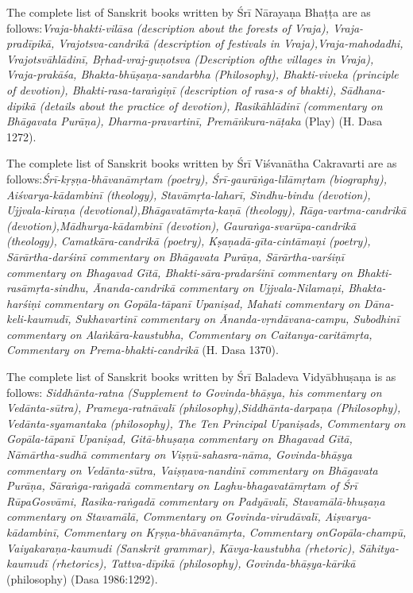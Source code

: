 The complete list of Sanskrit books written by Śrī Nārayaṇa Bhaṭṭa are as follows:{\sl  Vraja-bhakti-vilāsa {\rm (description about the forests of Vraja)}, Vraja-pradīpikā, Vrajotsva-candrikā {\rm (description of festivals in Vraja)},\break Vraja-mahodadhi, Vrajotsvāhlādinī, Bṛhad-vraj-guṇotsva {\rm (Description of\break the villages in Vraja)}, Vraja-prakāśa, Bhakta-bhūṣaṇa-sandarbha {\rm (Philosophy)}, Bhakti-viveka {\rm (principle of devotion)}, Bhakti-rasa-taraṅgiṇī {\rm (description of {\sl rasa}-s of {\sl bhakti})}, Sādhana-dipikā {\rm (details about the practice of devotion)}, Rasikāhlādinī {\rm (commentary on {\sl Bhāgavata Purāṇa})}, Dharma-pra\-vartinī, Premāṅkura-nāṭaka} {\rm (Play)} {\rm (H. Dasa 1272)}. 

{\rm The complete list of Sanskrit books written by Śrī Viśvanātha Cakra\-varti are as follows:}{\sl  Śrī-kṛṣṇa-bhāvanāmṛtam {\rm (poetry)}, Śrī-gaurāṅga-līlā\-mṛtam {\rm (biography)}, Aiśvarya-kādambinī {\rm (theology)}, Stavāmṛta-laharī, Sindhu-bindu {\rm (devotion)}, Ujjvala-kiraṇa  {\rm (devotional)},\break Bhāgavatāmṛta-kaṇā {\rm (theology)}, Rāga-vartma-candrikā {\rm (devotion)},\break Mādhurya-kādambinī {\rm (devotion)}, Gauraṅga-svarūpa-candrikā {\rm (theology)}, Camatkāra-candrikā {\rm (poetry)}, Kṣaṇadā-gīta-cintāmaṇi {\rm (poetry)}, Sārārtha-darśinī {\rm commentary on} Bhāgavata Purāṇa, Sārārtha-varśiṇī {\rm commentary on} Bhagavad Gītā, Bha\-kti-sāra-pradarśinī {\rm commentary on} Bhakti-rasāmṛta-sindhu, Ānanda-ca\-ndri\-kā {\rm commentary on} Ujjvala-Nilamaṇi, Bhakta-harśiṇi {\rm commentary on} Gopāla-tāpanī Upaniṣad, Mahati {\rm commentary on} Dāna-keli-kaumudī, Sukhavartinī {\rm commentary on} Ānanda-vṛndāvana-campu, Subodhinī commentary on Alaṅ\-kāra-kaustubha, {\rm Commentary on} Caitanya-caritā\-mṛta, {\rm Commentary on} Prema-bhakti-candrikā} {\rm (H. Dasa 1370)}. 

The complete list of Sanskrit books written by Śrī Baladeva Vidyā\-bhuṣaṇa is as follows: {\sl Siddhānta-ratna {\rm (Supplement to {\sl Govinda-bhāṣya}, his commentary on Vedānta-sūtra)}, Prameya-ratnāvalī {\rm (philosophy)},\break Siddhānta-darpaṇa {\rm (Philosophy)}, Vedānta-syamantaka {\rm (philosophy)}, The Ten Principal Upaniṣads, {\rm Commentary on} Gopāla-tāpanī Upaniṣad, Gitā-bhuṣaṇa {\rm commentary on} Bhagavad Gītā, Nāmārtha-sudhā {\rm commentary on} Viṣṇū-sahasra-nāma, Govinda-bhāṣya {\rm commentary on} Vedā\-nta-sūtra, Vaiṣṇava-nandinī {\rm commentary on} Bhāgavata Purāṇa, Sāraṅga-raṅgadā {\rm commentary on} Laghu-bhagavatāmṛtam {\rm of Śrī Rūpa\break Gosvāmi}, Rasika-raṅgadā {\rm commentary on} Padyāvalī, Stavamālā-bhuṣaṇa {\rm commentary on} Stavamālā, {\rm Commentary on} Govinda-virudāvalī, Aiṣva\-rya-kādambinī, {\rm Commentary on} Kṛṣṇa-bhāvanāmṛta, {\rm Commentary on}\break Gopāla-champū, Vai\-ya\-karaṇa-kaumudi {\rm (Sanskrit grammar)}, Kāvya-\Break kau\-stubha {\rm (rhetoric)}, Sā\-hitya-kaumudī {\rm (rhetorics)}, Tattva-dīpikā {\rm (philosophy)}, Govinda-bhāṣya-kārikā} {\rm (philosophy)} {\rm (Dasa 1986:1292)}. 

